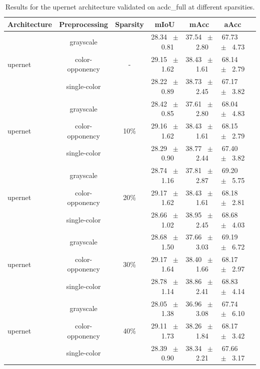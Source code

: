 \begin{table}[h]
  \centering
  \caption{Results for the upernet architecture validated on acdc_full at different sparsities.}
  \begin{tabular}{@{}lccc ccc@{}}
    \toprule
    Architecture & Preprocessing & Sparsity & mIoU & mAcc & aAcc \\
    \midrule

    \multirow{3}{*}{upernet} & grayscale & \multirow{3}{*}{-} & 28.34 ~$\pm$~ 0.81 & 37.54 ~$\pm$~ 2.80 & 67.73 ~$\pm$~ 4.73 \\
    & color-opponency &  & 29.15 ~$\pm$~ 1.62 & 38.43 ~$\pm$~ 1.61 & 68.14 ~$\pm$~ 2.79 \\
    & single-color &  & 28.22 ~$\pm$~ 0.89 & 38.73 ~$\pm$~ 2.45 & 67.17 ~$\pm$~ 3.82 \\
    \midrule
    \multirow{3}{*}{upernet} & grayscale & \multirow{3}{*}{10\%} & 28.42 ~$\pm$~ 0.85 & 37.61 ~$\pm$~ 2.80 & 68.04 ~$\pm$~ 4.83 \\
    & color-opponency &  & 29.16 ~$\pm$~ 1.62 & 38.43 ~$\pm$~ 1.61 & 68.15 ~$\pm$~ 2.79 \\
    & single-color &  & 28.29 ~$\pm$~ 0.90 & 38.77 ~$\pm$~ 2.44 & 67.40 ~$\pm$~ 3.82 \\
    \midrule
    \multirow{3}{*}{upernet} & grayscale & \multirow{3}{*}{20\%} & 28.74 ~$\pm$~ 1.16 & 37.81 ~$\pm$~ 2.87 & 69.20 ~$\pm$~ 5.75 \\
    & color-opponency &  & 29.17 ~$\pm$~ 1.62 & 38.43 ~$\pm$~ 1.61 & 68.18 ~$\pm$~ 2.81 \\
    & single-color &  & 28.66 ~$\pm$~ 1.02 & 38.95 ~$\pm$~ 2.45 & 68.68 ~$\pm$~ 4.03 \\
    \midrule
    \multirow{3}{*}{upernet} & grayscale & \multirow{3}{*}{30\%} & 28.68 ~$\pm$~ 1.50 & 37.66 ~$\pm$~ 3.03 & 69.19 ~$\pm$~ 6.72 \\
    & color-opponency &  & 29.17 ~$\pm$~ 1.64 & 38.40 ~$\pm$~ 1.66 & 68.17 ~$\pm$~ 2.97 \\
    & single-color &  & 28.78 ~$\pm$~ 1.14 & 38.86 ~$\pm$~ 2.41 & 68.83 ~$\pm$~ 4.14 \\
    \midrule
    \multirow{3}{*}{upernet} & grayscale & \multirow{3}{*}{40\%} & 28.05 ~$\pm$~ 1.38 & 36.96 ~$\pm$~ 3.08 & 67.74 ~$\pm$~ 6.10 \\
    & color-opponency &  & 29.11 ~$\pm$~ 1.73 & 38.26 ~$\pm$~ 1.84 & 68.17 ~$\pm$~ 3.42 \\
    & single-color &  & 28.39 ~$\pm$~ 0.90 & 38.34 ~$\pm$~ 2.21 & 67.66 ~$\pm$~ 3.17 \\

\end{tabular}
\end{table}
